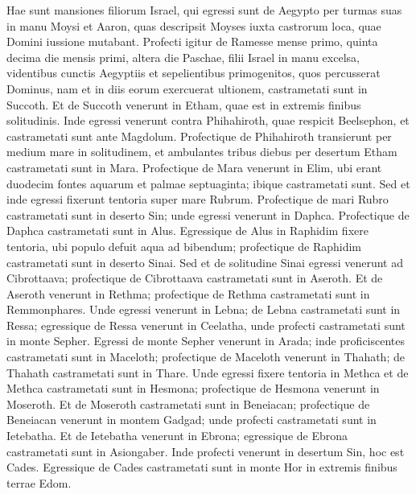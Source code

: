 \begin{biblechapter}  
\verse Hae sunt mansiones filiorum Israel, qui egressi sunt de Aegypto per turmas suas in manu Moysi et Aaron, 
\verse quas descripsit Moyses iuxta castrorum loca, quae Domini iussione mutabant. 
\verse Profecti igitur de Ramesse mense primo, quinta decima die mensis primi, altera die Paschae, filii Israel in manu excelsa, videntibus cunctis Aegyptiis 
\verse et sepelientibus primogenitos, quos percusserat Dominus, nam et in diis eorum exercuerat ultionem, 
\verse castrametati sunt in Succoth. 
\verse Et de Succoth venerunt in Etham, quae est in extremis finibus solitudinis. 
\verse Inde egressi venerunt contra Phihahiroth, quae respicit Beelsephon, et castrametati sunt ante Magdolum. 
\verse Profectique de Phihahiroth transierunt per medium mare in solitudinem, et ambulantes tribus diebus per desertum Etham castrametati sunt in Mara. 
\verse Profectique de Mara venerunt in Elim, ubi erant duodecim fontes aquarum et palmae septuaginta; ibique castrametati sunt. 
\verse Sed et inde egressi fixerunt tentoria super mare Rubrum. Profectique de mari Rubro 
\verse castrametati sunt in deserto Sin; 
\verse unde egressi venerunt in Daphca. 
\verse Profectique de Daphca castrametati sunt in Alus. 
\verse Egressique de Alus in Raphidim fixere tentoria, ubi populo defuit aqua ad bibendum; 
\verse profectique de Raphidim castrametati sunt in deserto Sinai. 
\verse Sed et de solitudine Sinai egressi venerunt ad Cibrottaava; 
\verse profectique de Cibrottaava castrametati sunt in Aseroth. 
\verse Et de Aseroth venerunt in Rethma; 
\verse profectique de Rethma castrametati sunt in Remmonphares. 
\verse Unde egressi venerunt in Lebna; 
\verse de Lebna castrametati sunt in Ressa; 
\verse egressique de Ressa venerunt in Ceelatha, 
\verse unde profecti castrametati sunt in monte Sepher. 
\verse Egressi de monte Sepher venerunt in Arada; 
\verse inde proficiscentes castrametati sunt in Maceloth; 
\verse profectique de Maceloth venerunt in Thahath; 
\verse de Thahath castrametati sunt in Thare. 
\verse Unde egressi fixere tentoria in Methca 
\verse et de Methca castrametati sunt in Hesmona; 
\verse profectique de Hesmona venerunt in Moseroth. 
\verse Et de Moseroth castrametati sunt in Beneiacan; 
\verse profectique de Beneiacan venerunt in montem Gadgad;  
\verse unde profecti castrametati sunt in Ietebatha. 
\verse Et de Ietebatha venerunt in Ebrona; 
\verse egressique de Ebrona castrametati sunt in Asiongaber. 
\verse Inde profecti venerunt in desertum Sin, hoc est Cades. 
\verse Egressique de Cades castrametati sunt in monte Hor in extremis finibus terrae Edom. 

\end{biblechapter}
